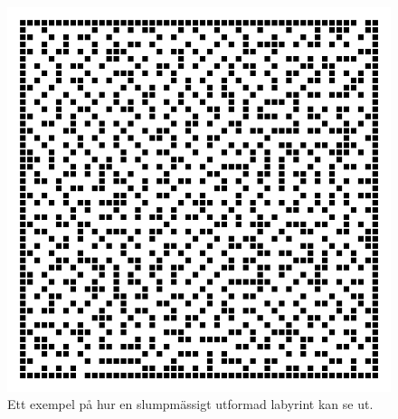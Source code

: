 \begin{figure}[h]
	\begin{center}
		\includegraphics[width=1.0\textwidth]{../img/w09-lab/RandomMaze.jpg}
	\end{center}
	\caption{Ett exempel på hur en slumpmässigt utformad labyrint kan se ut.}
\end{figure}
